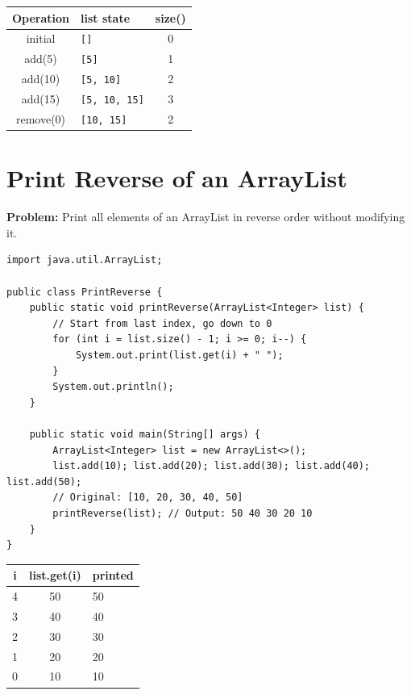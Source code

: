 \documentclass[12pt,a4paper,oneside]{book}
\begin{document}
\begin{dryrun}
\begin{center}
\begin{tabular}{clc}
\toprule
\textbf{Operation} & \textbf{list state} & \textbf{size()}\\
\midrule
initial           & \texttt{[]}          & 0\\
add(5)            & \texttt{[5]}         & 1\\
add(10)           & \texttt{[5, 10]}     & 2\\
add(15)           & \texttt{[5, 10, 15]} & 3\\
remove(0)         & \texttt{[10, 15]}    & 2\\
\bottomrule
\end{tabular}
\end{center}
\end{dryrun}

\section{Print Reverse of an ArrayList}

\textbf{Problem:} Print all elements of an ArrayList in reverse order without modifying it.

\begin{lstlisting}[caption={Print Reverse --- O(n) time O(1) extra space}]
import java.util.ArrayList;

public class PrintReverse {
    public static void printReverse(ArrayList<Integer> list) {
        // Start from last index, go down to 0
        for (int i = list.size() - 1; i >= 0; i--) {
            System.out.print(list.get(i) + " ");
        }
        System.out.println();
    }

    public static void main(String[] args) {
        ArrayList<Integer> list = new ArrayList<>();
        list.add(10); list.add(20); list.add(30); list.add(40); list.add(50);
        // Original: [10, 20, 30, 40, 50]
        printReverse(list); // Output: 50 40 30 20 10
    }
}
\end{lstlisting}

\begin{dryrun}[list = {[10, 20, 30, 40, 50]}]
\begin{center}
\begin{tabular}{ccl}
\toprule
\textbf{i} & \textbf{list.get(i)} & \textbf{printed}\\
\midrule
4 & 50 & 50\\
3 & 40 & 40\\
2 & 30 & 30\\
1 & 20 & 20\\
0 & 10 & 10\\
\bottomrule
\end{tabular}
\end{center}
\end{dryrun}
\end{document}
